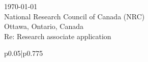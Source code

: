 \documentclass[12pt]{article} %
\begin{document}
\begin{paracol}{2} %


\parbox[top][0.1\textheight][c]{\linewidth}{ %
	\vspace{0.0\textheight} %
	\today\\[6pt]
	National Research Council of Canada (NRC)\\
	Ottawa, Ontario, Canada\\
	Re: Research associate application\\[6pt] \medskip
}


\switchcolumn %


\parbox[top][0.1\textheight][c]{\linewidth}{ %
	\vspace{0\textheight} %
	\colorbox{shade}{ %
		\begin{supertabular}{p{0.05\linewidth}|p{0.775\linewidth}} %
			\ifthenelse{\equal{\cvdate}{}}{}{\raisebox{-1pt}{\faInfo} & \cvdate \\}
			\ifthenelse{\equal{\cvaddress}{}}{}{\raisebox{-1pt}{\faHome} & \cvaddress \\} %
			\ifthenelse{\equal{\cvaddress}{}}{}{\raisebox{-1pt}{\faPhone} & \cvnumberphone \\} %
		\end{supertabular}
	}
}


\end{paracol}
\end{document}
